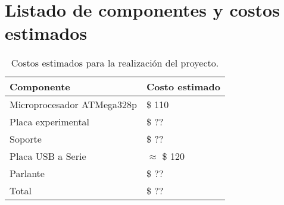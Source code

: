\section{Listado de componentes y costos estimados}
\label{sec:componentes}

\begin{table}[H]
  \centering
  \begin{tabular}{ll}
    \toprule
    Componente & Costo estimado \\
    \midrule
    Microprocesador ATMega328p & \$ 110 \\
    Placa experimental & \$ ?? \\
    Soporte & \$ ?? \\
    Placa USB a Serie & $\approx$ \$ 120 \\
	Parlante & \$ ?? \\
    \midrule
    Total & \$ ?? \\
    \bottomrule
  \end{tabular}
  \caption{Costos estimados para la realización del proyecto.}
  \label{table:costos}
\end{table}